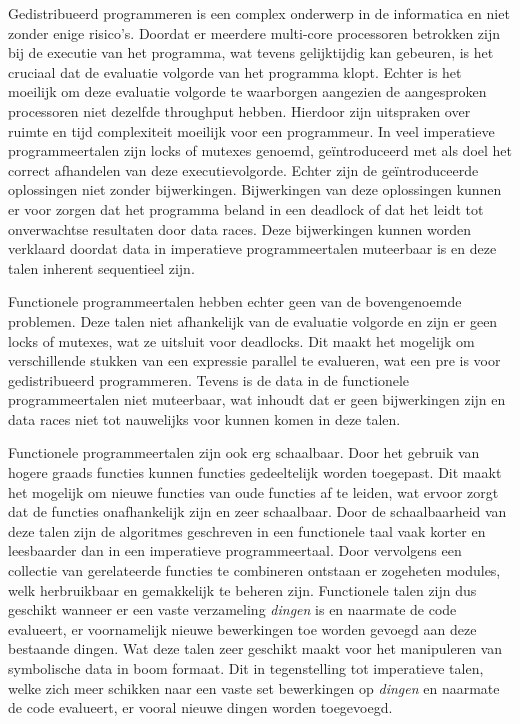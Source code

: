 \documentclass[twoside,twocolumn]{article}
\begin{document}
Gedistribueerd programmeren is een complex onderwerp in de informatica en niet
zonder enige risico's. Doordat er meerdere multi-core processoren betrokken
zijn bij de executie van het programma, wat tevens gelijktijdig kan gebeuren,
is het cruciaal dat de evaluatie volgorde van het programma klopt. Echter is
het moeilijk om deze evaluatie volgorde te waarborgen aangezien de aangesproken
processoren niet dezelfde throughput hebben. Hierdoor zijn uitspraken over
ruimte en tijd complexiteit moeilijk voor een programmeur. In veel imperatieve
programmeertalen zijn locks of mutexes genoemd, ge\"introduceerd met als
doel het correct afhandelen van deze executievolgorde. Echter zijn de
ge\"introduceerde oplossingen niet zonder bijwerkingen. Bijwerkingen van deze
oplossingen kunnen er voor zorgen dat het programma beland in een deadlock of
dat het leidt tot onverwachtse resultaten door data races\cite{pro13}. Deze
bijwerkingen kunnen worden verklaard doordat data in imperatieve
programmeertalen muteerbaar is en deze talen inherent sequentieel zijn.

Functionele programmeertalen hebben echter geen van de bovengenoemde problemen.
Deze talen niet afhankelijk van de evaluatie volgorde en zijn er geen locks of
mutexes, wat ze uitsluit voor deadlocks. Dit maakt het mogelijk om
verschillende stukken van een expressie parallel te evalueren, wat een pre is
voor gedistribueerd programmeren. Tevens is de data in de functionele
programmeertalen niet muteerbaar, wat inhoudt dat er geen bijwerkingen zijn
en data races niet tot nauwelijks voor kunnen komen in deze talen.

Functionele programmeertalen zijn ook erg schaalbaar. Door het gebruik van
hogere graads functies kunnen functies gedeeltelijk worden toegepast. Dit
maakt het mogelijk om nieuwe functies van oude functies af te leiden, wat
ervoor zorgt dat de functies onafhankelijk zijn en zeer schaalbaar. Door de
schaalbaarheid van deze talen zijn de algoritmes geschreven in een functionele
taal vaak korter en leesbaarder dan in een imperatieve programmeertaal. Door
vervolgens een collectie van gerelateerde functies te combineren ontstaan er
zogeheten modules, welk herbruikbaar en gemakkelijk te beheren zijn.
Functionele talen zijn dus geschikt wanneer er een vaste verzameling
\textit{dingen} is en naarmate de code evalueert, er voornamelijk nieuwe
bewerkingen toe worden gevoegd aan deze bestaande dingen. Wat deze talen zeer
geschikt maakt voor het manipuleren van symbolische data in boom formaat.
Dit in tegenstelling tot imperatieve talen, welke zich meer schikken naar een
vaste set bewerkingen op \textit{dingen} en naarmate de code evalueert, er
vooral nieuwe dingen worden toegevoegd.
\end{document}
